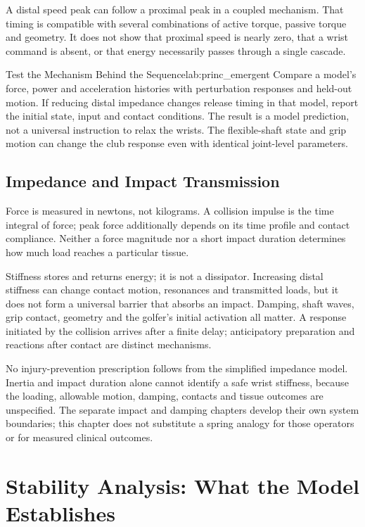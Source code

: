 A distal speed peak can follow a proximal peak in a coupled mechanism. That timing is compatible with several combinations of active torque, passive torque and geometry. It does not show that proximal speed is nearly zero, that a wrist command is absent, or that energy necessarily passes through a single cascade.

\begin{principle}{Test the Mechanism Behind the Sequence}{lab:princ_emergent}
Compare a model's force, power and acceleration histories with perturbation responses and held-out motion. If reducing distal impedance changes release timing in that model, report the initial state, input and contact conditions. The result is a model prediction, not a universal instruction to relax the wrists. The flexible-shaft state and grip motion can change the club response even with identical joint-level parameters.
\end{principle}

\subsection{Impedance and Impact Transmission}
\label{subsec:impact_protection}

Force is measured in newtons, not kilograms. A collision impulse is the time integral of force; peak force additionally depends on its time profile and contact compliance. Neither a force magnitude nor a short impact duration determines how much load reaches a particular tissue.

Stiffness stores and returns energy; it is not a dissipator. Increasing distal stiffness can change contact motion, resonances and transmitted loads, but it does not form a universal barrier that absorbs an impact. Damping, shaft waves, grip contact, geometry and the golfer's initial activation all matter. A response initiated by the collision arrives after a finite delay; anticipatory preparation and reactions after contact are distinct mechanisms.

No injury-prevention prescription follows from the simplified impedance model. Inertia and impact duration alone cannot identify a safe wrist stiffness, because the loading, allowable motion, damping, contacts and tissue outcomes are unspecified. The separate impact and damping chapters develop their own system boundaries; this chapter does not substitute a spring analogy for those operators or for measured clinical outcomes.

\section{Stability Analysis: What the Model Establishes}
\label{sec:stability}

